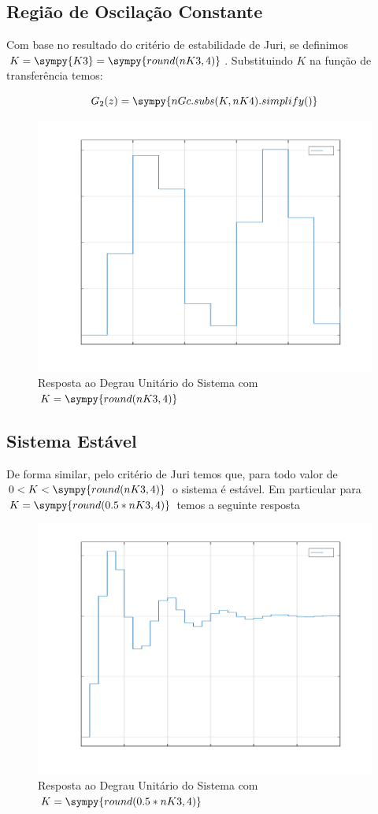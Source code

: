 \documentclass[a4paper,11pt]{article}
\newcommand{\npy}[1]{\sympy{round(#1,4)}}
\begin{document}
\subsection{Região de Oscilação Constante}

Com base no resultado do critério de estabilidade de Juri, se definimos $K = \sympy{K3}= \npy{nK3}$. Substituindo $K$ na função de transferência temos:

\begin{equation}\label{eq:closedloop-sys-oscilation}
    G_{2}(z) = \sympy{nGc.subs(K,nK4).simplify()}
\end{equation}

\begin{figure}[H]
    \centering
    \includegraphics[width=0.8\linewidth]{img/exsim1-plot-oscilation-inc.pdf}
    \caption{Resposta ao Degrau Unitário do Sistema com $K = \npy{nK3}$}
\end{figure}

\subsection{Sistema Estável}

De forma similar, pelo critério de Juri temos que, para todo valor de $0< K < \npy{nK3}$ o sistema é estável. Em particular para $K = \npy{0.5*nK3}$ temos a seguinte resposta

\begin{figure}[H]
    \centering
    \includegraphics[width=0.8\linewidth]{img/exsim1-plot-stable-inc.pdf}
    \caption{Resposta ao Degrau Unitário do Sistema com $K = \npy{0.5*nK3}$}
\end{figure}
\end{document}
